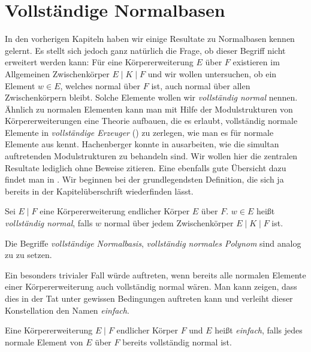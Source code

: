 \chapter{Vollständige Normalbasen}
\label{chap:vollst_normalbasen}

In den vorherigen Kapiteln haben wir einige Resultate zu Normalbasen kennen
gelernt. Es stellt sich jedoch ganz natürlich die Frage, ob dieser Begriff
nicht erweitert werden kann: Für eine Körpererweiterung $E$ über $F$ existieren
im Allgemeinen Zwischenkörper $E \mid K \mid F$ und wir wollen untersuchen,
ob ein Element $w \in E$, welches normal über $F$ ist, auch normal über allen
Zwischenkörpern bleibt. Solche Elemente wollen wir \emph{vollständig normal}
nennen. Ähnlich zu normalen Elementen kann man mit Hilfe der Modulstrukturen
von Körpererweiterungen eine Theorie aufbauen, die es erlaubt, vollständig
normale Elemente in \emph{vollständige Erzeuger} () zu
zerlegen, wie man es für normale Elemente aus 
kennt. Hachenberger konnte in \autocite{hachenberger1997finite} ausarbeiten, wie
die simultan auftretenden Modulstrukturen zu behandeln sind. Wir wollen hier
die zentralen Resultate lediglich ohne Beweise zitieren. Eine ebenfalls gute
Übersicht dazu findet man in \autocite[Section 5.4]{mullen2013handbook}.
Wir beginnen bei der grundlegendsten Definition, die sich ja bereits in der
Kapitelüberschrift wiederfinden lässt.

\begin{definition}
  \label{def:vollst_normal}
  Sei $E \mid F$ eine Körpererweiterung endlicher Körper $E$ über $F$.
  $w\in E$ heißt \emph{vollständig normal}, falls $w$ normal über jedem
  Zwischenkörper $E \mid K\mid F$ ist.

  Die Begriffe \emph{vollständige Normalbasis}, \emph{vollständig normales
  Polynom} sind analog zu  zu setzen.
\end{definition}

Ein besonders trivialer Fall würde auftreten, wenn bereits alle normalen
Elemente einer Körpererweiterung auch vollständig normal wären. Man kann zeigen,
dass dies in der Tat unter gewissen Bedingungen auftreten kann und verleiht
dieser Konstellation den Namen \emph{einfach}.

\begin{definition}[einfach]
  \label{def:einfach}
  Eine Körpererweiterung $E \mid F$ endlicher Körper $F$ und $E$ heißt 
  \emph{einfach}, falls jedes normale Element von $E$ über $F$ bereits
  vollständig normal ist.
\end{definition}


